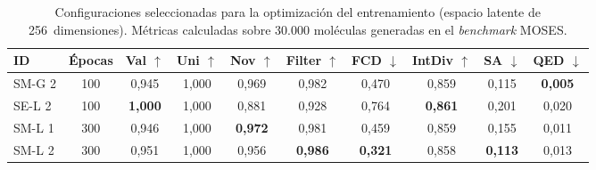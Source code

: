 \begin{table}[htbp]
\centering
\caption{Configuraciones seleccionadas para la optimización del entrenamiento (espacio latente de 256~dimensiones). Métricas calculadas sobre 30.000 moléculas generadas en el \textit{benchmark} MOSES.}
\label{tab:mejores_modelos_vae}
\begin{tabular}{lccccccccc}
\toprule
ID & Épocas & Val $\uparrow$ & Uni $\uparrow$ & Nov $\uparrow$ & Filter $\uparrow$ & FCD $\downarrow$ & IntDiv $\uparrow$ & SA $\downarrow$ & QED $\downarrow$ \\
\midrule
SM-G 2 & 100 & 0,945 & 1,000 & 0,969 & 0,982 & 0,470 & 0,859 & 0,115 & \textbf{0,005} \\
SE-L 2 & 100 & \textbf{1,000} & 1,000 & 0,881 & 0,928 & 0,764 & \textbf{0,861} & 0,201 & 0,020 \\
SM-L 1 & 300 & 0,946 & 1,000 & \textbf{0,972} & 0,981 & 0,459 & 0,859 & 0,155 & 0,011 \\
SM-L 2 & 300 & 0,951 & 1,000 & 0,956 & \textbf{0,986} & \textbf{0,321} & 0,858 & \textbf{0,113} & 0,013 \\
\bottomrule
\end{tabular}
\end{table}
